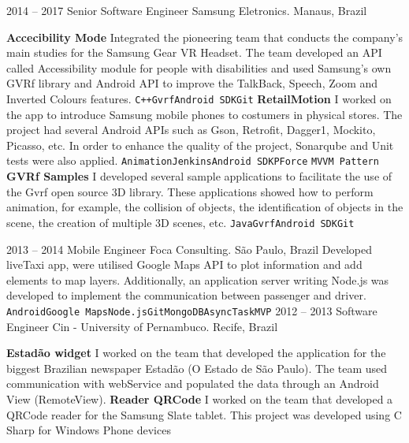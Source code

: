 \documentclass[9pt]{developercv} %
\begin{document}
\begin{entrylist}
\entry
		{2014 -- 2017}
		{Senior Software Engineer}
		{Samsung Eletronics. Manaus, Brazil}
{
\newline
\textbf{Accecibility Mode}  Integrated the pioneering team that conducts the company's main studies for the Samsung Gear VR Headset. The team developed an API called Accessibility module for people with disabilities and used Samsung's own GVRf library and Android API to improve the TalkBack, Speech, Zoom and Inverted Colours features.\newline
{\texttt{C++}\slashsep\texttt{Gvrf}\slashsep\texttt{Android SDK}\slashsep\texttt{Git}}
\newline 
\newline  
\textbf{RetailMotion} I worked on the app to introduce Samsung mobile phones to costumers in physical stores. The project had several Android APIs such as Gson, Retrofit, Dagger1, Mockito, Picasso, etc. In order to enhance the quality of the project, Sonarqube and Unit tests were also applied.
  {\texttt{Animation}\slashsep\texttt{Jenkins}\slashsep\texttt{Android SDK}\slashsep\texttt{PForce} \texttt{MVVM Pattern}}
\newline
\newline
 \textbf{GVRf Samples} I developed several sample applications to facilitate the use of the Gvrf open source 3D library. These applications showed how to perform animation, for example, the collision of objects, the identification of objects in the scene, the creation of multiple 3D scenes, etc.
{\texttt{Java}\slashsep\texttt{Gvrf}\slashsep\texttt{Android SDK}\slashsep\texttt{Git}}

}
	\entry
		{2013 -- 2014}
		{Mobile Engineer}
		{Foca Consulting. São Paulo, Brazil}
{\newline
Developed liveTaxi app, were utilised Google Maps API to plot information and add elements to map layers. Additionally, an application server writing Node.js was developed to implement the communication between passenger and driver.\newline
		{\texttt{Android}\slashsep\texttt{Google Maps}\slashsep\texttt{Node.js}\slashsep\texttt{Git}\slashsep\texttt{MongoDB}\slashsep\texttt{AsyncTask}\slashsep\texttt{MVP}}}
\entry
		{2012 -- 2013}
		{Software Engineer}
		{Cin - University of Pernambuco. Recife, Brazil}
{\newline
\textbf{Estadão widget} I worked on the team that developed the application for the biggest Brazilian newspaper Estadão (O Estado de São Paulo). The team used communication with webService and populated the data through an Android View (RemoteView).
\newline
\newline
\textbf{Reader QRCode} I worked on the team that developed a QRCode reader for the Samsung Slate tablet. This project was developed using C Sharp for Windows Phone devices

}
\end{entrylist}
\end{document}
